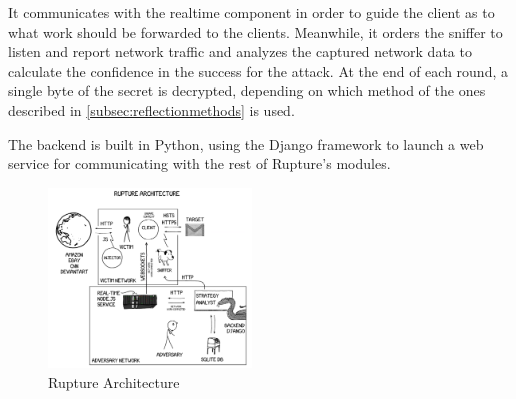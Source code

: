 It communicates with the realtime component in order to guide the client as to
what work should be forwarded to the clients. Meanwhile, it orders the sniffer
to listen and report network traffic and analyzes the captured network data to
calculate the confidence in the success for the attack. At the end of each
round, a single byte of the secret is decrypted, depending on which method of
the ones described in \ref{subsec:reflectionmethods} is used.

The backend is built in Python, using the Django framework to launch a web
service for communicating with the rest of Rupture's modules.

   \begin{figure}[thpb]
      \centering
          \includegraphics[width=0.48\textwidth]{figures/architecture.png}
      \caption{Rupture Architecture}
   \end{figure}
